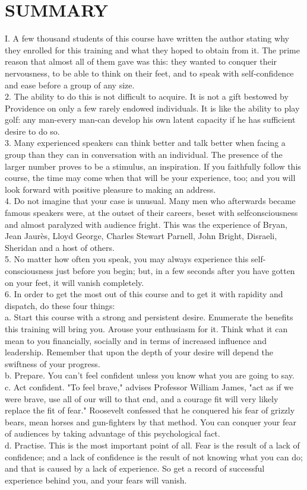\documentclass[10pt]{article}
\begin{document}
\section*{SUMMARY}
I. A few thousand students of this course have written the author stating why they enrolled for this training and what they hoped to obtain from it. The prime reason that almost all of them gave was this: they wanted to conquer their nervousness, to be able to think on their feet, and to speak with self-confidence and ease before a group of any size.\\
2. The ability to do this is not difficult to acquire. It is not a gift bestowed by Providence on only a few rarely endowed individuals. It is like the ability to play golf: any man-every man-can develop his own latent capacity if he has sufficient desire to do so.\\
3. Many experienced speakers can think better and talk better when facing a group than they can in conversation with an individual. The presence of the larger number proves to be a stimulus, an inspiration. If you faithfully follow this course, the time may come when that will be your experience, too; and you will look forward with positive pleasure to making an address.\\
4. Do not imagine that your case is unusual. Many men who afterwards became famous speakers were, at the outset of their careers, beset with selfconsciousness and almost paralyzed with audience fright. This was the experience of Bryan, Jean Jaurès, Lloyd George, Charles Stewart Parnell, John Bright, Disraeli, Sheridan and a host of others.\\
5. No matter how often you speak, you may always experience this self-consciousness just before you begin; but, in a few seconds after you have gotten on your feet, it will vanish completely.\\
6. In order to get the most out of this course and to get it with rapidity and dispatch, do these four things:\\
a. Start this course with a strong and persistent desire. Enumerate the benefits this training will bring you. Arouse your enthusiasm for it. Think what it can mean to you financially, socially and in terms of increased influence and leadership. Remember that upon the depth of your desire will depend the swiftness of your progress.\\
b. Prepare. You can't feel confident unless you know what you are going to say.\\
c. Act confident. "To feel brave," advises Professor William James, "act as if we were brave, use all of our will to that end, and a courage fit will very likely replace the fit of fear." Roosevelt confessed that he conquered his fear of grizzly bears, mean horses and gun-fighters by that method. You can conquer your fear of audiences by taking advantage of this psychological fact.\\
d. Practise. This is the most important point of all. Fear is the result of a lack of confidence; and a lack of confidence is the result of not knowing what you can do; and that is caused by a lack of experience. So get a record of successful experience behind you, and your fears will vanish.
\end{document}
